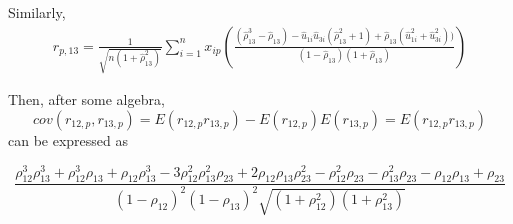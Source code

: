 \documentclass[12pt]{article}
\theoremstyle{theorem}
\begin{document}
\noindent Similarly,
\begin{align*}
    r_{p,13} = 
    \frac{1}{\sqrt{n(1+\hat{\rho}_{13}^2)}}\sum_{i=1}^{n}x_{ip} \left( 
    \frac{(\hat{\rho}_{13}^3 - \hat{\rho}_{13}) - \hat{u}_{1i}\hat{u}_{3i}(\hat{\rho}_{13}^2 + 1) + \hat{\rho}_{13}(\hat{u}_{1i}^2 + \hat{u}_{3i}^2))}{(1-\hat{\rho}_{13})(1+\hat{\rho}_{13})}
    \right)
\end{align*}

\noindent Then, after some algebra,
$$cov(r_{12,p}, r_{13,p}) = E(r_{12,p}r_{13,p}) - E(r_{12,p})E(r_{13,p}) = E(r_{12,p}r_{13,p})$$
can be expressed as 

$$\frac{\rho_{12}^3\rho_{13}^3 + \rho_{12}^3 \rho_{13} + \rho_{12}\rho_{13}^3 - 3\rho_{12}^2\rho_{13}^2\rho_{23} + 2\rho_{12}\rho_{13}\rho_{23}^2 - \rho_{12}^2\rho_{23} - \rho_{13}^2\rho_{23} - \rho_{12}\rho_{13} + \rho_{23}}{(1-\rho_{12})^2(1-\rho_{13})^2\sqrt{(1+\rho_{12}^2)(1+\rho_{13}^2)}}$$









\end{document}
